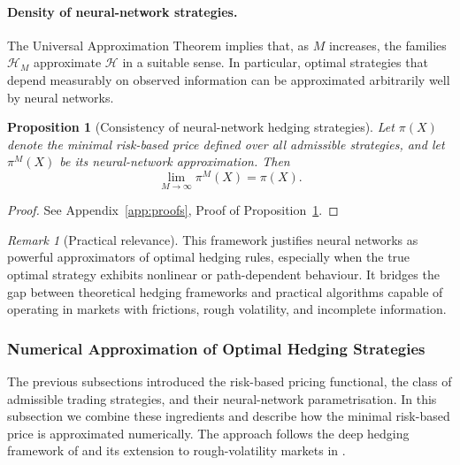 \documentclass[12pt,a4paper]{article}
\theoremstyle{definition}
\theoremstyle{plain}
\newtheorem{proposition}{Proposition}[section]
\theoremstyle{remark}
\newtheorem{remark}{Remark}[section]
\theoremstyle{plain}
\begin{document}
\paragraph{Density of neural-network strategies.}
The Universal Approximation Theorem implies that, as $M$ increases, the families $\mathcal{H}_M$ approximate $\mathcal{H}$ in a suitable sense. 
In particular, optimal strategies that depend measurably on observed information can be approximated arbitrarily well by neural networks.

\begin{proposition}[Consistency of neural-network hedging strategies]
\label{prop:NN_consistency}
Let $\pi(X)$ denote the minimal risk-based price defined over all admissible strategies, and let $\pi^{M}(X)$ be its neural-network approximation. 
Then
\[
    \lim_{M \to \infty} \pi^{M}(X) = \pi(X).
\]
\end{proposition}

\begin{proof}
See Appendix~\ref{app:proofs}, Proof of Proposition~\ref{prop:NN_consistency}.
\end{proof}

\begin{remark}[Practical relevance]\label{rem:nn_practical_relevance}
This framework justifies neural networks as powerful approximators of optimal hedging rules, especially when the true optimal strategy exhibits nonlinear or path-dependent behaviour. 
It bridges the gap between theoretical hedging frameworks and practical algorithms capable of operating in markets with frictions, rough volatility, and incomplete information.
\end{remark}

\subsubsection{Numerical Approximation of Optimal Hedging Strategies}

The previous subsections introduced the risk-based pricing functional, the class of admissible trading strategies, and their neural-network parametrisation. 
In this subsection we combine these ingredients and describe how the minimal risk-based price is approximated numerically.
The approach follows the deep hedging framework of \cite{Buehler2019DeepHedging} and its extension to rough-volatility markets in \cite{Horvath2021DeepRough}.
\end{document}
